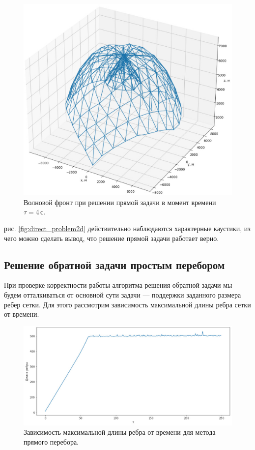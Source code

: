 \documentclass[12pt, cleqn, a4paper]{article}
\begin{document}
\begin{figure}[H] 
\centering
\includegraphics[width=1.0\linewidth]{direct_problem3d.eps}
\caption{Волновой фронт при решении прямой задачи в момент времени $\tau = 4$\,с.}
\label{fig:direct_problem3d}
\end{figure}

 рис. \ref{fig:direct_problem2d} действительно наблюдаются характерные каустики, из чего можно сделать вывод, что решение прямой задачи работает верно.

\subsection{Решение обратной задачи простым перебором}
При проверке корректности работы алгоритма решения обратной задачи мы будем отталкиваться от основной сути задачи --- поддержки заданного размера ребер сетки. Для этого рассмотрим зависимость максимальной длины ребра сетки от времени.
\begin{figure}[H] 
\centering
\includegraphics[width=1.0\linewidth]{direct_search_edge_len.eps}
\caption{Зависимость максимальной длины ребра от времени для метода прямого перебора.}
\label{fig:direct_search_edge_len}
\end{figure}
\end{document}
